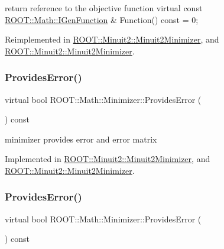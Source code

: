 return reference to the objective function virtual const \mbox{\hyperlink{namespaceROOT_1_1Math_afe6400b4439b79d54c41fb9f5c5af171}{R\+O\+O\+T\+::\+Math\+::\+I\+Gen\+Function}} \& Function() const = 0; 

Reimplemented in \mbox{\hyperlink{classROOT_1_1Minuit2_1_1Minuit2Minimizer_a0caadc2005eac5d87fc7345bd54decf0}{R\+O\+O\+T\+::\+Minuit2\+::\+Minuit2\+Minimizer}}, and \mbox{\hyperlink{classROOT_1_1Minuit2_1_1Minuit2Minimizer_a0caadc2005eac5d87fc7345bd54decf0}{R\+O\+O\+T\+::\+Minuit2\+::\+Minuit2\+Minimizer}}.

\mbox{\label{classROOT_1_1Math_1_1Minimizer_a71837caa295c76303c1a14679be1898d}} 
\subsubsection{\texorpdfstring{ProvidesError()}{ProvidesError()}\hspace{0.1cm}{\footnotesize\ttfamily [1/2]}}
{\footnotesize\ttfamily virtual bool R\+O\+O\+T\+::\+Math\+::\+Minimizer\+::\+Provides\+Error (\begin{DoxyParamCaption}{ }\end{DoxyParamCaption}) const\hspace{0.3cm}{\ttfamily [pure virtual]}}



minimizer provides error and error matrix 



Implemented in \mbox{\hyperlink{classROOT_1_1Minuit2_1_1Minuit2Minimizer_a3a3a8abea38285fe639f2f0ec5505533}{R\+O\+O\+T\+::\+Minuit2\+::\+Minuit2\+Minimizer}}, and \mbox{\hyperlink{classROOT_1_1Minuit2_1_1Minuit2Minimizer_a3a3a8abea38285fe639f2f0ec5505533}{R\+O\+O\+T\+::\+Minuit2\+::\+Minuit2\+Minimizer}}.

\mbox{\label{classROOT_1_1Math_1_1Minimizer_a71837caa295c76303c1a14679be1898d}} 
\subsubsection{\texorpdfstring{ProvidesError()}{ProvidesError()}\hspace{0.1cm}{\footnotesize\ttfamily [2/2]}}
{\footnotesize\ttfamily virtual bool R\+O\+O\+T\+::\+Math\+::\+Minimizer\+::\+Provides\+Error (\begin{DoxyParamCaption}{ }\end{DoxyParamCaption}) const\hspace{0.3cm}{\ttfamily [pure virtual]}}



